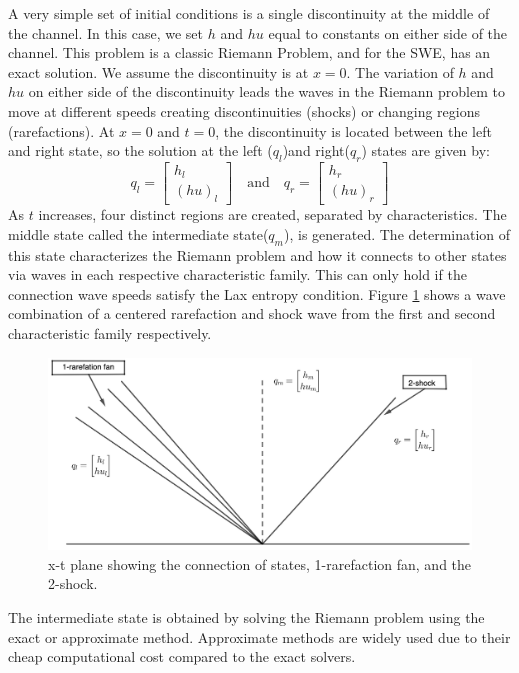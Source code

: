 \documentclass[12pt,a4paper]{article}
\begin{document}
	A very simple set of initial conditions is a single discontinuity at the middle of the channel.  In this case, we set $h$ and $hu$ equal to constants on either side of the channel.  This problem is a classic Riemann Problem, and for the SWE, has an exact solution.  We assume the discontinuity is at $x = 0$. 
	The variation of $h$ and $hu$ on either side of the discontinuity leads the waves in the Riemann problem to move at different speeds creating discontinuities (shocks) or changing regions (rarefactions).  At $x = 0$ and $t = 0$,   the discontinuity is located between the left and right state, so the solution at the left ($q_{l}$)and right($q_{r}$) states are given by: 
	\begin{equation}
		q_{l} = \begin{bmatrix}
			h_{l} \\( hu)_{l}
		\end{bmatrix}  \quad \text{and} \quad q_{r} = \begin{bmatrix}
			h_{r} \\( hu)_{r}
		\end{bmatrix} 
	\label{ic}
	\end{equation}
	As $t$ increases, four distinct regions are created, separated by characteristics. 
	The middle state called the intermediate state($q_{m}$), is generated.  The determination of this state characterizes the Riemann problem and how it connects to other states via waves in each respective characteristic family\cite{ba-le-mi-ro:2003}.  This can only hold if the connection wave speeds satisfy the Lax entropy condition. Figure \ref{fig:x-tplane} shows a wave combination of a centered rarefaction  and shock wave from the first and second characteristic family respectively.
	
	\begin{figure}[H]
		\centering
		\includegraphics[width=0.5\linewidth]{images/geo1}
		\caption{ x-t plane showing the connection of states, 1-rarefaction fan, and the 2-shock.}
		\label{fig:x-tplane}
	\end{figure}
	
	The intermediate state is obtained by solving the Riemann problem using the exact or  approximate method. Approximate methods are widely used due to their cheap computational cost compared to the exact solvers.
	
\end{document}
